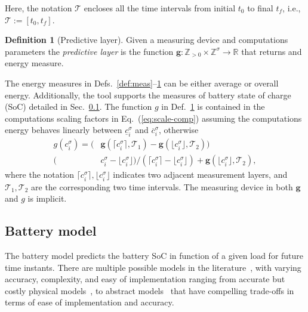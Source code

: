 \documentclass[letterpaper,10pt,journal,twoside]{IEEEtran}
\theoremstyle{definition}
\newtheorem{defn}{Definition}[section]
\begin{document}
Here, the notation $\mathcal{T}$ encloses all the time intervals from initial $t_0$ to final $t_f$, i.e., $\mathcal{T}:=[t_0,t_f]$.

\begin{defn}[Predictive layer]\label{def:pred}
  Given a measuring device and computations parameters the \emph{predictive layer} is the function $\mathbf{g}:\mathbb{Z}_{>0}\times\mathbb{Z}^\sigma\rightarrow\mathbb{R}$ that returns and energy measure.
\end{defn}

The energy measures in Defs.~\ref{def:meas}--\ref{def:pred} can be either average or overall energy. Additionally, the tool supports the measures of battery state of charge (SoC) detailed in Sec.~\ref{sec:mod-bat}. The function $g$ in Def.~\ref{def:pred} is contained in the computations scaling factors in Eq.~(\ref{eq:scale-comp}) assuming the computations energy behaves linearly between $\underline{c}_i^\sigma$ and $\overline{c}_i^\sigma$, otherwise
\begin{equation}\label{eq:piece-wise-reg}\begin{split}
  g(c_i^\sigma)=(&\mathbf{g}(\lceil c_i^\sigma\rceil,\mathcal{T}_1)-\mathbf{g}(\lfloor c_i^\sigma\rfloor,\mathcal{T}_2))\\(&c_i^\sigma-\lfloor c_i^\sigma\rfloor)/(\lceil c_i^\sigma\rceil-\lfloor c_i^\sigma\rfloor)+\mathbf{g}(\lfloor c_i^\sigma\rfloor,\mathcal{T}_2),
\end{split}\end{equation}
where the notation $\lceil c_i^\sigma\rceil,\lfloor c_i^\sigma\rfloor$ indicates two adjacent measurement layers, and $\mathcal{T}_1,\mathcal{T}_2$ are the corresponding two time intervals. The measuring device in both $\mathbf{g}$ and $g$ is implicit.

\subsection{Battery model}
\label{sec:mod-bat}

The battery model predicts the battery SoC in function of a given load for future time instants. There are multiple possible models in the literature~\cite{rao2003battery}, with varying accuracy, complexity, and easy of implementation ranging from accurate but costly physical models~\cite{moura2017battery,marcicki2013design}, to abstract models~\cite{xing2014state,he2011evaluation,hinz2019comparison,mousavi2014various} that have compelling trade-offs in terms of ease of implementation and accuracy. 
\end{document}

